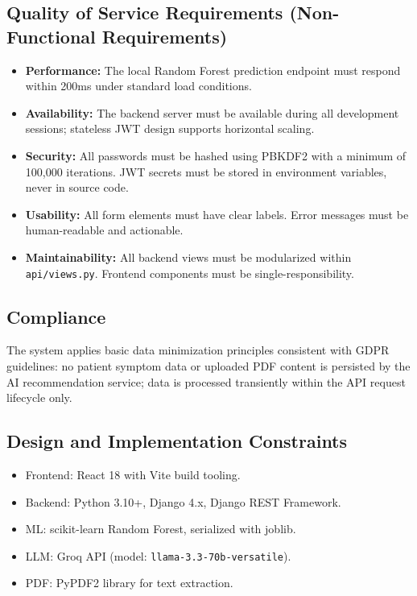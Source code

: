 \subsection{Quality of Service Requirements (Non-Functional Requirements)}
\begin{itemize}
    \item \textbf{Performance:} The local Random Forest prediction endpoint must respond within 200ms under standard load conditions.
    \item \textbf{Availability:} The backend server must be available during all development sessions; stateless JWT design supports horizontal scaling.
    \item \textbf{Security:} All passwords must be hashed using PBKDF2 with a minimum of 100,000 iterations. JWT secrets must be stored in environment variables, never in source code.
    \item \textbf{Usability:} All form elements must have clear labels. Error messages must be human-readable and actionable.
    \item \textbf{Maintainability:} All backend views must be modularized within \texttt{api/views.py}. Frontend components must be single-responsibility.
\end{itemize}

\subsection{Compliance}
The system applies basic data minimization principles consistent with GDPR guidelines: no patient symptom data or uploaded PDF content is persisted by the AI recommendation service; data is processed transiently within the API request lifecycle only.

\subsection{Design and Implementation Constraints}
\begin{itemize}
    \item Frontend: React 18 with Vite build tooling.
    \item Backend: Python 3.10+, Django 4.x, Django REST Framework.
    \item ML: scikit-learn Random Forest, serialized with joblib.
    \item LLM: Groq API (model: \texttt{llama-3.3-70b-versatile}).
    \item PDF: PyPDF2 library for text extraction.
\end{itemize}

